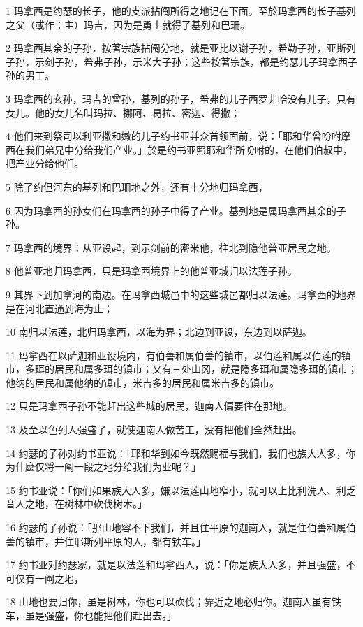 \par 1 玛拿西是约瑟的长子，他的支派拈阄所得之地记在下面。至於玛拿西的长子基列之父（或作：主）玛吉，因为是勇士就得了基列和巴珊。
\par 2 玛拿西其余的子孙，按著宗族拈阄分地，就是亚比以谢子孙，希勒子孙，亚斯列子孙，示剑子孙，希弗子孙，示米大子孙；这些按著宗族，都是约瑟儿子玛拿西子孙的男丁。
\par 3 玛拿西的玄孙，玛吉的曾孙，基列的孙子，希弗的儿子西罗非哈没有儿子，只有女儿。他的女儿名叫玛拉、挪阿、曷拉、密迦、得撒；
\par 4 他们来到祭司以利亚撒和嫩的儿子约书亚并众首领面前，说：「耶和华曾吩咐摩西在我们弟兄中分给我们产业。」於是约书亚照耶和华所吩咐的，在他们伯叔中，把产业分给他们。
\par 5 除了约但河东的基列和巴珊地之外，还有十分地归玛拿西，
\par 6 因为玛拿西的孙女们在玛拿西的孙子中得了产业。基列地是属玛拿西其余的子孙。
\par 7 玛拿西的境界：从亚设起，到示剑前的密米他，往北到隐他普亚居民之地。
\par 8 他普亚地归玛拿西，只是玛拿西境界上的他普亚城归以法莲子孙。
\par 9 其界下到加拿河的南边。在玛拿西城邑中的这些城邑都归以法莲。玛拿西的地界是在河北直通到海为止；
\par 10 南归以法莲，北归玛拿西，以海为界；北边到亚设，东边到以萨迦。
\par 11 玛拿西在以萨迦和亚设境内，有伯善和属伯善的镇市，以伯莲和属以伯莲的镇市，多珥的居民和属多珥的镇市；又有三处山冈，就是隐多珥和属隐多珥的镇市；他纳的居民和属他纳的镇市，米吉多的居民和属米吉多的镇市。
\par 12 只是玛拿西子孙不能赶出这些城的居民，迦南人偏要住在那地。
\par 13 及至以色列人强盛了，就使迦南人做苦工，没有把他们全然赶出。
\par 14 约瑟的子孙对约书亚说：「耶和华到如今既然赐福与我们，我们也族大人多，你为什麽仅将一阄一段之地分给我们为业呢？」
\par 15 约书亚说：「你们如果族大人多，嫌以法莲山地窄小，就可以上比利洗人、利乏音人之地，在树林中砍伐树木。」
\par 16 约瑟的子孙说：「那山地容不下我们，并且住平原的迦南人，就是住伯善和属伯善的镇市，并住耶斯列平原的人，都有铁车。」
\par 17 约书亚对约瑟家，就是以法莲和玛拿西人，说：「你是族大人多，并且强盛，不可仅有一阄之地，
\par 18 山地也要归你，虽是树林，你也可以砍伐；靠近之地必归你。迦南人虽有铁车，虽是强盛，你也能把他们赶出去。」

